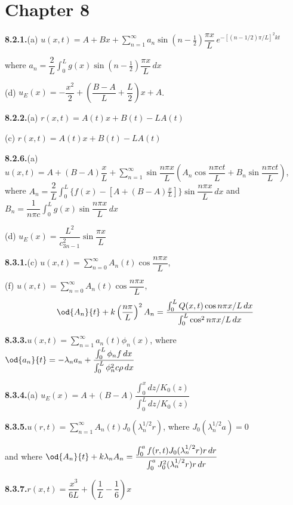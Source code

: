 \section*{Chapter 8}

\textbf{8.2.1.}\quad (a) $u(x,t) = A + Bx + \sum_{n=1}^{\infty}a_n\sin\left(n-\frac{1}{2}\right)\dfrac{\pi x}{L}\,e^{-[(n-1/2)\pi/L]^2 kt}$

where $a_n = \dfrac{2}{L}\int_0^L g(x)\sin\left(n-\frac{1}{2}\right)\dfrac{\pi x}{L}\,dx$

\quad (d) $u_E(x) = -\dfrac{x^2}{2}+\left(\dfrac{B-A}{L}+\dfrac{L}{2}\right)x+A$.

\medskip
\textbf{8.2.2.}\quad (a) $r(x,t) = A(t)x + B(t) - LA(t)$

\quad (c) $r(x,t) = A(t)x + B(t) - LA(t)$

\medskip
\textbf{8.2.6.}\quad (a) $u(x,t) = A + (B-A)\dfrac{x}{L} + \sum_{n=1}^{\infty}\sin\dfrac{n\pi x}{L}\left(A_n\cos\dfrac{n\pi ct}{L}+B_n\sin\dfrac{n\pi ct}{L}\right)$,
where $A_n = \dfrac{2}{L}\int_0^L\{f(x)-[A+(B-A)\frac{x}{L}]\}\sin\dfrac{n\pi x}{L}\,dx$ and
$B_n = \dfrac{1}{n\pi c}\int_0^L g(x)\sin\dfrac{n\pi x}{L}\,dx$

\quad (d) $u_E(x) = \dfrac{L^2}{c^2_{3n-1}}\sin\dfrac{\pi x}{L}$%

\medskip
\textbf{8.3.1.}\quad (c) $u(x,t) = \sum_{n=0}^{\infty}A_n(t)\cos\dfrac{n\pi x}{L}$,

\quad (f) $u(x,t) = \sum_{n=0}^{\infty}A_n(t)\cos\dfrac{n\pi x}{L}$,
\[
\od{A_n}{t} + k\left(\dfrac{n\pi}{L}\right)^2 A_n = \dfrac{\int_0^L Q(x,t)\cos n\pi x/L\,dx}{\int_0^L\cos^2 n\pi x/L\,dx}
\]

\medskip
\textbf{8.3.3.}\quad $u(x,t) = \sum_{n=1}^{\infty}a_n(t)\phi_n(x)$, where $\od{a_n}{t} = -\lambda_n a_n + \dfrac{\int_0^L \phi_n f\,dx}{\int_0^L \phi_n^2 c\rho\,dx}$

\medskip
\textbf{8.3.4.}\quad (a) $u_E(x) = A + (B-A)\dfrac{\int_0^x dz/K_0(z)}{\int_0^L dz/K_0(z)}$

\medskip
\textbf{8.3.5.}\quad $u(r,t) = \sum_{n=1}^{\infty}A_n(t)J_0(\lambda_n^{1/2}r)$, where $J_0(\lambda_n^{1/2}a) = 0$

and where $\od{A_n}{t} + k\lambda_n A_n = \dfrac{\int_0^a f(r,t)J_0(\lambda_n^{1/2}r)r\,dr}{\int_0^a J_0^2(\lambda_n^{1/2}r)r\,dr}$

\medskip
\textbf{8.3.7.}\quad $r(x,t) = \dfrac{x^3}{6L}+\left(\dfrac{1}{L}-\dfrac{1}{6}\right)x$

